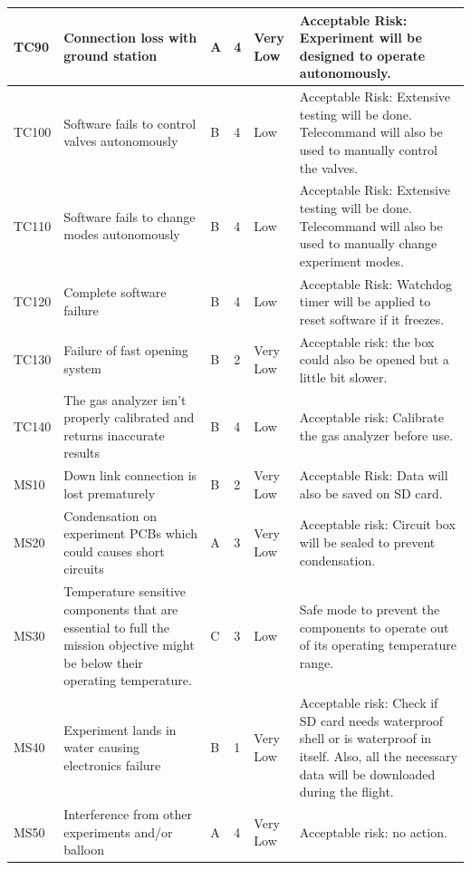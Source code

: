 \documentclass[a4paper,12pt,twoside]{article}
\providecommand{\DIFaddtex}[1]{{\protect\color{blue}\uwave{#1}}} %
\providecommand{\DIFaddbegin}{} %
\providecommand{\DIFaddend}{} %
\providecommand{\DIFadd}[1]{\texorpdfstring{\DIFaddtex{#1}}{#1}} %
\newcommand{\DIFaddincludegraphics}[2][]{{\color{blue}\fbox{\DIFOincludegraphics[#1]{#2}}}} %
\DeclareRobustCommand{\DIFaddbegin}{\DIFOaddbegin \let\includegraphics\DIFaddincludegraphics} %
\DeclareRobustCommand{\DIFaddend}{\DIFOaddend \let\includegraphics\DIFOincludegraphics} %
\begin{document}
\begin{landscape}
\begin{longtable}{|m{}| m{} |m{} |m{}|m{}| m{}|}
TC90 & Connection loss with ground station & A & 4 & \cellcolor[HTML]{34FF34}Very Low & Acceptable Risk: Experiment will be designed to operate autonomously. \\ \hline
TC100 & Software fails to control valves autonomously & B & 4 & \cellcolor[HTML]{FCFF2F}Low & Acceptable Risk: Extensive testing will be done. Telecommand will also be used to manually control the valves. \\ \hline
TC110 & Software fails to change modes autonomously & B & 4 & \cellcolor[HTML]{FCFF2F}Low & Acceptable Risk: Extensive testing will be done. Telecommand will also be used to manually change experiment modes. \\ \hline
TC120 & Complete software failure & B & 4 & \cellcolor[HTML]{FCFF2F}Low & Acceptable Risk: Watchdog timer will be applied to reset software if it freezes. \\ \hline
TC130 & Failure of fast opening system & B & 2 & \cellcolor[HTML]{34FF34}Very Low & Acceptable risk: the box could also be opened but a little bit slower. \\ \hline
TC140 & The gas analyzer isn't properly calibrated and returns inaccurate results & B & 4 & \cellcolor[HTML]{FCFF2F}Low & Acceptable risk: Calibrate the gas analyzer before use.\\ \hline
MS10 & Down link connection is lost prematurely & B & 2 & \cellcolor[HTML]{34FF34}Very Low & Acceptable Risk: Data will also be saved on SD card. \\ \hline
MS20 & Condensation on experiment PCBs which could causes short circuits & A & 3 & \cellcolor[HTML]{34FF34}Very Low & Acceptable risk: Circuit box will be sealed to prevent condensation. \\ \hline
MS30 & Temperature sensitive components that are essential to full the mission objective might be below their operating temperature. & C & 3 & \cellcolor[HTML]{FCFF2F}Low & \DIFaddbegin \DIFadd{Acceptable Risk: }\DIFaddend Safe mode to prevent the components to operate out of its operating temperature range. \\ \hline
MS40 & Experiment lands in water causing electronics failure & B & 1 & \cellcolor[HTML]{34FF34}Very Low & Acceptable risk: Check if SD card needs waterproof shell or is waterproof in itself. Also, all the necessary data will be downloaded during the flight. \\ \hline
MS50 & Interference from other experiments and/or balloon & A & 4 & \cellcolor[HTML]{34FF34}Very Low & Acceptable risk: no action. \\ \hline

\end{longtable}
\end{landscape}
\end{document}
